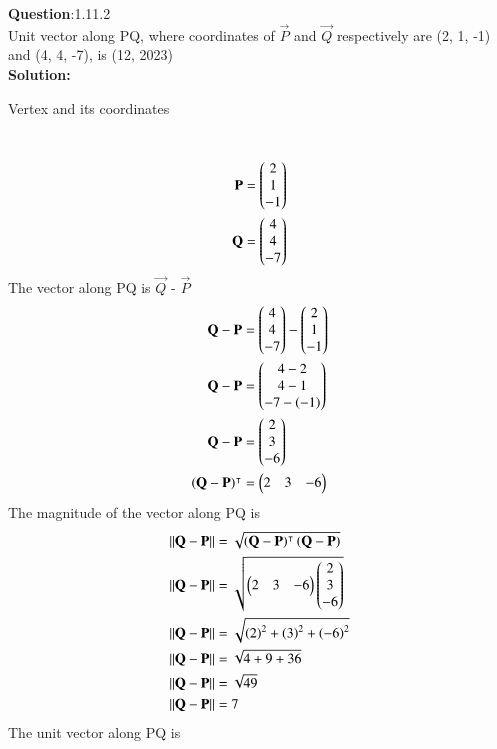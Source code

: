 \documentclass[journal]{IEEEtran}
\begin{document}
\textbf{Question}:1.11.2\\
Unit vector along PQ, where coordinates of $\vec{P}$ and $\vec{Q}$ respectively are (2, 1, -1) and (4, 4, -7), is \hfill(12, 2023)
\\
\textbf{Solution:}
\renewcommand{\tablename}{Table 1.11.2.1}
\begin{table}[h!]
  \centering
  
  \caption{Vertex and its coordinates}
\end{table}
\\
 \begin{align}
    \mathbf{P} & = \begin{pmatrix}2 \\ 1 \\ -1\end{pmatrix} \\
    \mathbf{Q} & = \begin{pmatrix}4 \\ 4 \\ -7\end{pmatrix}
    \end{align}
The vector along PQ is $\vec{Q}$ - $\vec{P}$
    \begin{align}
    \mathbf{Q} - \mathbf{P} & = \begin{pmatrix}4 \\ 4 \\ -7\end{pmatrix} - \begin{pmatrix}2 \\ 1 \\ -1\end{pmatrix} \\
    \mathbf{Q} - \mathbf{P} & = \begin{pmatrix}4 - 2 \\ 4 - 1 \\ -7 - \left(-1\right)\end{pmatrix} \\
    \mathbf{Q} - \mathbf{P} & = \begin{pmatrix}2 \\ 3 \\ -6\end{pmatrix} \\
    \left(\mathbf{Q} - \mathbf{P}\right)^\intercal & = \begin{pmatrix}2 & 3 & -6\end{pmatrix}
 \end{align}
The magnitude of the vector along PQ is
\begin{align}
\left\lVert\mathbf{Q} - \mathbf{P}\right\rVert & = \sqrt{\left(\mathbf{Q} - \mathbf{P}\right)^\intercal\left(\mathbf{Q} - \mathbf{P}\right)} \\
   \left\lVert\mathbf{Q} - \mathbf{P}\right\rVert & = \sqrt{\begin{pmatrix}2 & 3 & -6\end{pmatrix} \begin{pmatrix}2 \\ 3 \\ -6\end{pmatrix}} \\
   \left\lVert\mathbf{Q} - \mathbf{P}\right\rVert & = \sqrt{\left(2\right)^2 + \left(3\right)^2 + \left(-6\right)^2} \\
   \left\lVert\mathbf{Q} - \mathbf{P}\right\rVert & = \sqrt{4 + 9 + 36} \\
   \left\lVert\mathbf{Q} - \mathbf{P}\right\rVert & = \sqrt{49} \\
   \left\lVert\mathbf{Q} - \mathbf{P}\right\rVert & = 7 
\end{align}
The unit vector along PQ is 
\end{document}
